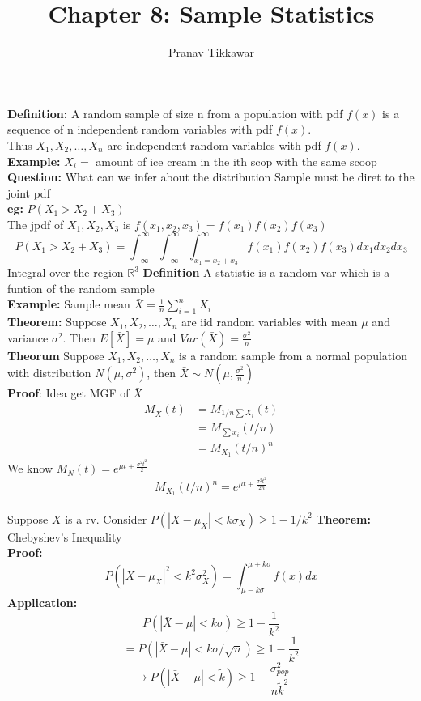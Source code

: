 \documentclass{article}
\author{Pranav Tikkawar}
\title{Chapter 8: Sample Statistics}
\begin{document}
\maketitle

\textbf{Definition:} A random sample of size n from a population with pdf $f(x)$ is a sequence of n independent random variables with pdf $f(x)$.\\
Thus $X_1, X_2, \ldots, X_n$ are independent random variables with pdf $f(x)$.\\
\textbf{Example:} $X_i =$ amount of ice cream  in the ith scop with the same scoop\\
\textbf{Question:} What can we infer about the distribution
Sample must be diret to the joint pdf\\
\textbf{eg:} $P ( X_1 > X_2 + X_3)$\\
The jpdf of $X_1, X_2, X_3$ is $f(x_1, x_2, x_3) = f(x_1)f(x_2)f(x_3)$\\
$$P(X_1 > X_2 + X_3) = \int_{-\infty}^{\infty} \int_{-\infty}^{\infty} \int_{x_1=x_2+x_3}^{\infty} f(x_1)f(x_2)f(x_3) dx_1 dx_2 dx_3$$
Integral over the region $\mathds{R}^3$
\textbf{Definition} A statistic is a random var which is a funtion of the random sample\\
\textbf{Example:} Sample mean $\bar{X} = \frac{1}{n} \sum_{i=1}^{n} X_i$\\
\textbf{Theorem:} Suppose $X_1, X_2, \ldots, X_n$ are iid random variables with mean $\mu$ and variance $\sigma^2$. Then $E[\bar{X}] = \mu$ and $Var(\bar{X}) = \frac{\sigma^2}{n}$\\
\textbf{Theorum} Suppose $X_1, X_2, \ldots, X_n$ is a random sample from a normal population  with distribution $N(\mu, \sigma^2)$, then $\bar{X} \sim N(\mu, \frac{\sigma^2}{n})$\\ 
\textbf{Proof}:
Idea get MGF of $\bar{X}$\\
\begin{align*}
M_{\bar{X}}(t) &= M_{1/n \sum X_i}(t) \\
&= M_{\sum x_i}(t/n) \\
&= M_{X_1}(t/n)^n
\end{align*}
We know $M_{N}(t) = e^{\mu t + \frac{\sigma^2 t^2}{2}}$\\
$$M_{X_1}(t/n)^n = e^{{\mu t} + \frac{\sigma^2 t^2}{2n}}$$\\
Suppose $X$ is a rv.
Consider $P(|X - \mu_X| < k \sigma_X) \geq 1 - 1/k^2$
\textbf{Theorem:} Chebyshev's Inequality\\
\textbf{Proof: } \\
$$P(|X - \mu_X|^2 < k^2 \sigma_X^2) = \int_{\mu - k\sigma}^{\mu + k\sigma} f(x) dx$$
\textbf{Application: }\\
$$P(|\bar{X} - \mu| < k \sigma) \geq 1 - \frac{1}{k^2}$$
$$ = P(|\bar{X} - \mu| < k \sigma/\sqrt{n}) \geq 1 - \frac{1}{k^2}$$
$$ \rightarrow P(|\bar{X} - \mu| < \tilde{k}) \geq 1 - \frac{\sigma_{pop}^2}{n \tilde{k}^2} $$
\end{document}
